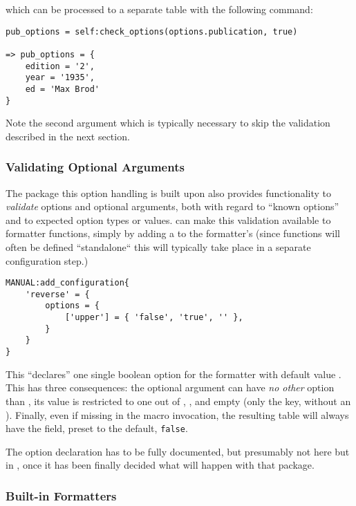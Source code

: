 \documentclass[12pt]{scrartcl}
\begin{document}
\noindent which can be processed to a separate table with the following command:

\begin{verbatim}
pub_options = self:check_options(options.publication, true)

=> pub_options = {
	edition = '2',
	year = '1935',
	ed = 'Max Brod'
}
\end{verbatim}

\noindent Note the second argument  which is typically necessary to
skip the validation described in the next section.


\subsubsection{Validating Optional Arguments}
\label{sec:defining:validating-optional-arguments}

The  package this option handling is built upon also
provides functionality to \emph{validate} options and optional arguments, both
with regard to “known options” and to expected option types or values.
 can make this validation available to formatter
functions, simply by adding a  to the formatter's
 (since functions will often be defined “standalone“ this will typically take place in a separate configuration step.)

\begin{verbatim}
MANUAL:add_configuration{
	'reverse' = {
		options = {
			['upper'] = { 'false', 'true', '' },
		}
	}
}
\end{verbatim}

\noindent This “declares” one single boolean option for the 
formatter with default value .  This has three consequences: the
optional argument can have \emph{no other} option than , its value
is restricted to one out of , , and empty (only the
key, without an \luavar{=}). Finally, even if missing in the macro invocation,
the resulting  table will always have the  field,
preset to the default, \texttt{false}.

\medskip

 The option declaration has to be fully documented, but
presumably not here but in , once it has been finally
decided what will happen with that package.


\subsubsection{Built-in Formatters}
\label{sec:builtin-formatters}
\end{document}
